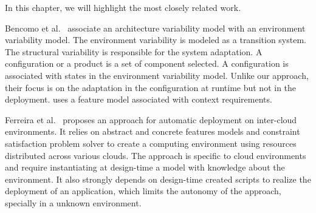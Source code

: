 
In this chapter, we will highlight the most closely related
work.





Bencomo et al.~\cite{bencomo_dynamically_2008} associate an architecture variability model with an environment variability model. The environment variability is modeled as a transition system. The structural variability is responsible for the system adaptation. A configuration or a product is a set of component selected. A configuration is associated with states in the environment variability model. Unlike our approach, their focus is on the adaptation in the configuration at runtime but not in the deployment. \citep{mizouni_framework_2014} uses a feature model associated with context requirements.

Ferreira et al.~\cite{ferreira_leite_user_2014} proposes an approach for automatic deployment on inter-cloud environments. It relies on abstract and concrete features models and constraint satisfaction problem solver to create a computing environment using resources distributed across various clouds. The approach is specific to cloud environments and require instantiating at design-time a model with knowledge about the environment. It also strongly depends on design-time created scripts to realize the deployment of an application, which limits the autonomy of the approach, specially in a unknown environment.

